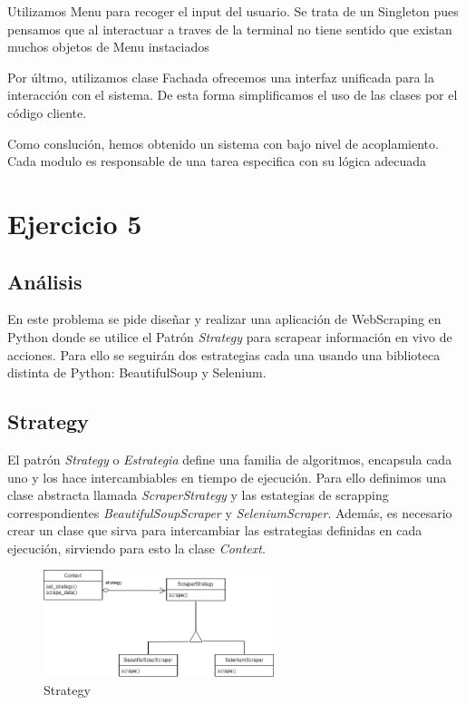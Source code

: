 \documentclass{article}
\begin{document}
\begin{itemize}
Utilizamos Menu para recoger el input del usuario. Se trata de un Singleton pues pensamos que al interactuar a traves de la terminal no tiene sentido que existan muchos objetos de Menu instaciados  


Por últmo, utilizamos clase Fachada ofrecemos una interfaz unificada para la interacción con el sistema. De esta forma simplificamos el uso de las clases por el código cliente.

Como conslución, hemos obtenido un sistema con bajo nivel de acoplamiento. Cada modulo es responsable de una tarea especifica con su lógica adecuada



\section{Ejercicio 5}
\subsection{Análisis}
En este problema se pide diseñar y realizar una aplicación de WebScraping en Python donde se utilice el Patrón \textit{Strategy} para scrapear información en vivo de acciones.  Para ello se seguirán dos estrategias cada una usando una biblioteca distinta de Python: BeautifulSoup y Selenium.

\subsection{Strategy}
El patrón \textit{Strategy} o \textit{Estrategia} define una familia de algoritmos, encapsula cada uno y los hace intercambiables en tiempo de ejecución. Para ello definimos una clase abstracta llamada \textit{ScraperStrategy} y las estategias de scrapping correspondientes \textit{BeautifulSoupScraper} y \textit{SeleniumScraper}. Además, es necesario crear un clase que sirva para intercambiar las estrategias definidas en cada ejecución, sirviendo para esto la clase \textit{Context}.

\begin{figure}[h]
	\centering
        \vspace{15pt}
	\includegraphics[width=0.6\textwidth]{DS_ej5.drawio.png}
	\caption{Strategy}
	\label{fig:strategy}
\end{figure}



\end{itemize}
\end{document}
